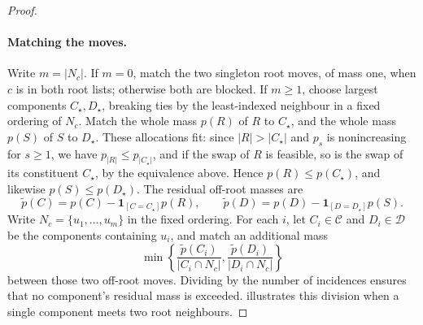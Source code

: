 \documentclass[11pt,reqno]{article}
\theoremstyle{plain}
\theoremstyle{definition}
\theoremstyle{remark}
\theoremstyle{definition}
\theoremstyle{remark}
\newcommand{\one}[1]{\mathbf{1}_{\left[#1\right]}}   %
\begin{document}
\begin{proof}
\paragraph{Matching the moves.}
Write \(m=|N_c|\).  If \(m=0\), match the two singleton root moves,
of mass one, when \(c\) is in both root lists; otherwise both are blocked.
If \(m\ge1\), choose largest components \(C_\star,D_\star\), breaking
ties by the least-indexed neighbour in a fixed ordering of \(N_c\).
Match the whole mass \(p(R)\) of \(R\) to \(C_\star\), and the whole
mass \(p(S)\) of \(S\) to \(D_\star\).  These allocations fit: since
\(|R|>|C_\star|\) and \(p_s\) is nonincreasing for \(s\ge1\), we have
\(p_{|R|}\le p_{|C_\star|}\), and if the swap of \(R\) is feasible, so is
the swap of its constituent \(C_\star\), by the equivalence above.  Hence
\(p(R)\le p(C_\star)\), and likewise \(p(S)\le p(D_\star)\).  The residual
off-root masses are
\[
  \tilde p(C)=p(C)-\one{C=C_\star}p(R),
  \qquad \tilde p(D)=p(D)-\one{D=D_\star}p(S).
\]
Write \(N_c=\{u_1,\ldots,u_m\}\) in the fixed ordering.  For each \(i\),
let \(C_i\in\mathcal C\) and \(D_i\in\mathcal D\) be the components
containing \(u_i\), and match
an additional mass
\begin{equation}\label{eq:incidence-matrix-entry}
  \min\left\{\frac{\tilde p(C_i)}{|C_i\cap N_c|},
                  \frac{\tilde p(D_i)}{|D_i\cap N_c|}\right\}
\end{equation}
between those two off-root moves.  Dividing by the number of incidences
ensures that no component's residual mass is exceeded.
 illustrates this division when a single
component meets two root neighbours.


\end{proof}
\end{document}
